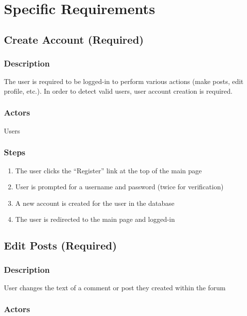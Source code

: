 \documentclass[12pt]{scrartcl}
\begin{document}
\section{Specific Requirements}
\subsection{Create Account (Required)}
\subsubsection{Description}

The user is required to be logged-in to perform various actions (make posts, edit profile, etc.).
In order to detect valid users, user account creation is required. 

\subsubsection{Actors}

Users

\subsubsection{Steps}

\begin{enumerate}
\item The user clicks the ``Register'' link at the top of the main page
\item User is prompted for a username and password (twice for verification)
\item A new account is created for the user in the database
\item The user is redirected to the main page and logged-in
\end{enumerate}

\subsection{Edit Posts (Required)}
\subsubsection{Description}

User changes the text of a comment or post they created within the forum

\subsubsection{Actors}
\end{document}
